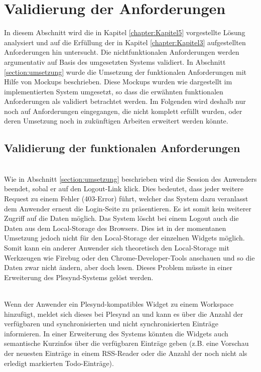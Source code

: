 \section{Validierung der Anforderungen}\label{section:validierung_der_anforderungen}
In diesem Abschnitt wird die in Kapitel \ref{chapter:Kapitel5} vorgestellte Lösung analysiert und auf die Erfüllung der in Kapitel \ref{chapter:Kapitel3} aufgestellten Anforderungen hin untersucht. Die nichtfunktionalen Anforderungen werden argumentativ auf Basis des umgesetzten Systems validiert. In Abschnitt \ref{section:umsetzung} wurde die Umsetzung der funktionalen Anforderungen mit Hilfe von Mockups beschrieben. Diese Mockups wurden wie dargestellt im implementierten System umgesetzt, so dass die erwähnten funktionalen Anforderungen als validiert betrachtet werden. Im Folgenden wird deshalb nur noch auf Anforderungen eingegangen, die nicht komplett erfüllt wurden, oder deren Umsetzung noch in zukünftigen Arbeiten erweitert werden könnte.

\subsection{Validierung der funktionalen Anforderungen}\label{section:funktionale_anforderungen_validierung}
\textbullet{}  \emph{\requirementKeinZugriffNachLogout}\\
Wie in Abschnitt \ref{section:umsetzung} beschrieben wird die Session des Anwenders beendet, sobal er auf den Logout-Link klick. Dies bedeutet, dass jeder weitere Request zu einem Fehler (403-Error) führt, welcher das System dazu veranlasst dem Anwender erneut die Login-Seite zu präsentieren. Es ist somit kein weiterer Zugriff auf die Daten möglich. Das System löscht bei einem Logout auch die Daten aus dem Local-Storage des Browsers. Dies ist in der momentanen Umsetzung jedoch nicht für den Local-Storage der einzelnen Widgets möglich. Somit kann ein anderer Anwender sich theoretisch den Local-Storage mit Werkzeugen wie Firebug oder den Chrome-Developer-Tools anschauen und so die Daten zwar nicht ändern, aber doch lesen. Dieses Problem müsste in einer Erweiterung des Plesynd-Systems gelöst werden.

\textbullet{}  \emph{\requirementWidgetInformSystem}\\
Wenn der Anwender ein Plesynd-kompatibles Widget zu einem Workspace hinzufügt, meldet sich dieses bei Plesynd an und kann es über die Anzahl der verfügbaren und synchronisierten und nicht synchronisierten Einträge informieren. In einer Erweiterung des Systems könnten die Widgets auch semantische Kurzinfos über die verfügbaren Einträge geben (z.B. eine Vorschau der neuesten Einträge in einem RSS-Reader oder die Anzahl der noch nicht als erledigt markierten Todo-Einträge).


